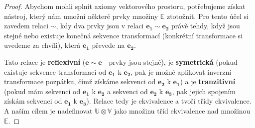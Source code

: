\documentclass[a5paper,12pt]{amsbook}
\theoremstyle{definition}
\newcommand{\myvec}[1]{\bm{#1}}
\newcommand{\myspace}[1]{\mathbb{#1}}
\begin{document}
\begin{proof}
Abychom mohli splnit axiomy vektorového prostoru, potřebujeme získat nástroj,
který nám umožní některé prvky množiny $\myspace{E}$ ztotožnit. Pro tento účel
si zavedem relaci $\sim$, kdy dva prvky jsou v relaci $\myvec{e_1}\sim\myvec{e_2}$
právě tehdy, když jsou stejné nebo existuje konečná sekvence transformací
(konkrétní transformace si uvedeme za chvíli), která $\myvec{e_1}$ převede
na $\myvec{e_2}$.

Tato relace je \textbf{reflexivní} ($\myvec{e}\sim\myvec{e}$ - prvky jsou stejné),
je \textbf{symetrická} (pokud existuje sekvence transformací od $\myvec{e_1}$ k
$\myvec{e_2}$, pak je možné aplikovat inverzní transformace pozpátku, čímž
získáme sekvenci od $\myvec{e_2}$ k $\myvec{e_1}$) a je \textbf{tranzitivní}
(pokud mám sekvenci od $\myvec{e_1}$ k $\myvec{e_2}$ a sekvenci od $\myvec{e_2}$
k $\myvec{e_3}$, pak jejich spojením získám sekvenci od $\myvec{e_1}$ k $\myvec{e_3}$).
Relace tedy je ekvivalence a tvoří třídy ekvivalence. A naším cílem je nadefinovat
$\myspace{U}\otimes\myspace{V}$ jako množinu tříd ekvivalence nad množinou
$\myspace{E}$.


\end{proof}
\end{document}
